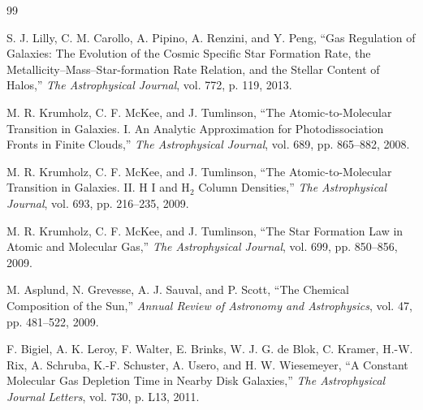 \documentclass[10pt,a4paper]{article}
\begin{document}
\begin{minipage}[t][0.92\textheight][t]{0.47\textwidth}

\vspace{0pt}

\footnotesize

\begin{thebibliography}{99}

\setlength{\itemsep}{0.45em}
\setlength{\parskip}{0pt}

S. J. Lilly, C. M. Carollo, A. Pipino, A. Renzini, and Y. Peng,
``Gas Regulation of Galaxies: The Evolution of the Cosmic Specific
Star Formation Rate, the Metallicity--Mass--Star-formation Rate
Relation, and the Stellar Content of Halos,''
\textit{The Astrophysical Journal},
vol. 772, p. 119, 2013.

M. R. Krumholz, C. F. McKee, and J. Tumlinson,
``The Atomic-to-Molecular Transition in Galaxies. I.
An Analytic Approximation for Photodissociation Fronts in Finite Clouds,''
\textit{The Astrophysical Journal},
vol. 689, pp. 865--882, 2008.

M. R. Krumholz, C. F. McKee, and J. Tumlinson,
``The Atomic-to-Molecular Transition in Galaxies. II.
H I and H$_2$ Column Densities,''
\textit{The Astrophysical Journal},
vol. 693, pp. 216--235, 2009.

M. R. Krumholz, C. F. McKee, and J. Tumlinson,
``The Star Formation Law in Atomic and Molecular Gas,''
\textit{The Astrophysical Journal},
vol. 699, pp. 850--856, 2009.

M. Asplund, N. Grevesse, A. J. Sauval, and P. Scott,
``The Chemical Composition of the Sun,''
\textit{Annual Review of Astronomy and Astrophysics},
vol. 47, pp. 481--522, 2009.

F. Bigiel, A. K. Leroy, F. Walter, E. Brinks,
W. J. G. de Blok, C. Kramer, H.-W. Rix,
A. Schruba, K.-F. Schuster, A. Usero, and H. W. Wiesemeyer,
``A Constant Molecular Gas Depletion Time in Nearby Disk Galaxies,''
\textit{The Astrophysical Journal Letters},
vol. 730, p. L13, 2011.

\end{thebibliography}

\end{minipage}
\end{document}
